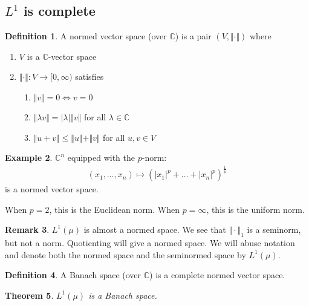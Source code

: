 \documentclass[11pt]{amsart}
\newtheorem{theorem}{Theorem}[section]
\theoremstyle{definition}
\newtheorem{definition}[theorem]{Definition}
\newtheorem{remark}[theorem]{Remark}
\newtheorem{example}[theorem]{Example}
\numberwithin{equation}{section}
\begin{document}
\subsection{\texorpdfstring{$L^1$}{L1} is complete}
\begin{definition}
    A normed vector space (over $\mathbb C$) is a pair $(V,\Vert\cdot\Vert)$ where
    \begin{enumerate}
        \item [(i)] $V$ is a $\mathbb C$-vector space
        \item [(ii)] $\Vert\cdot\Vert:V\to[0,\infty)$ satisfies
        \begin{enumerate}
            \item [(a)] $\Vert v\Vert=0\iff v=0$
            \item [(b)] $\Vert \lambda v\Vert=|\lambda|\Vert v\Vert$ for all $\lambda\in\mathbb C$
            \item [(c)] $\Vert u+v\Vert\le\Vert u\Vert+\Vert v\Vert$ for all $u,v\in V$
        \end{enumerate}
    \end{enumerate}
\end{definition}
\begin{example}
    $\mathbb C^n$ equipped with the $p$-norm:
    \begin{align*}
        (x_1,\ldots,x_n)\mapsto\left(|x_1|^p+\ldots+|x_n|^p\right)^\frac{1}{p}
    \end{align*}
    is a normed vector space.

    When $p=2$, this is the Euclidean norm. When $p=\infty$, this is the uniform norm.
\end{example}
\begin{remark}
    $L^1(\mu)$ is almost a normed space. We see that $\Vert\cdot\Vert_1$ is a seminorm, but not a norm. Quotienting will give a normed space. We will abuse notation and denote both the normed space and the seminormed space by $L^1(\mu)$.
\end{remark}
\begin{definition}
    A Banach space (over $\mathbb C$) is a complete normed vector space.
\end{definition}
\begin{theorem}
    $L^1(\mu)$ is a Banach space.
\end{theorem}
\end{document}
